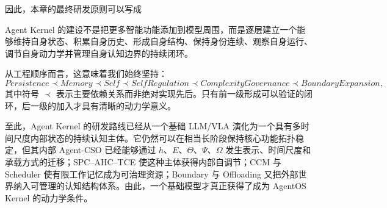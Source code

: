因此，本章的最终研发原则可以写成
\begin{proposition*}
Agent Kernel 的建设不是把更多智能功能添加到模型周围，而是逐层建立一个能够维持自身状态、积累自身历史、形成自身结构、保持身份连续、观察自身运行、调节自身动力学并管理自身认知边界的持续闭环。
\end{proposition*}

从工程顺序而言，这意味着我们始终坚持：
\[
\boxed{
Persistence
\prec
Memory
\prec
Self
\prec
SelfRegulation
\prec
ComplexityGovernance
\prec
BoundaryExpansion,
}
\]
其中符号 $\prec$ 表示主要依赖关系而非绝对实现先后。只有前一级形成可以验证的闭环，后一级的加入才具有清晰的动力学意义。

至此，Agent Kernel 的研发路线已经从一个基础 LLM/VLA 演化为一个具有多时间尺度内部状态的持续认知主体。它仍然可以在相当长阶段保持核心功能拓扑稳定，但其内部 Agent-CSO 已经能够通过 $h$、$E$、$\Theta$、$\Psi$、$\Omega$ 发生表示、时间尺度和承载方式的迁移；SPC--AHC--TCE 使这种主体获得内部自调节；CCM 与 Scheduler 使有限工作记忆成为可治理资源；Boundary 与 Offloading 又把外部世界纳入可管理的认知结构体系。由此，一个基础模型才真正获得了成为 AgentOS Kernel 的动力学条件。
